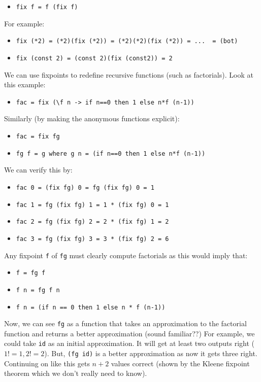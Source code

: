 \documentclass[11pt,a4paper,titlepage,dvipsnames,cmyk]{scrartcl}
\begin{document}
\begin{itemize}
    \item \lstinline|fix f = f (fix f)| 
\end{itemize}

For example:
\begin{itemize}
    \item \lstinline|fix (*2) = (*2)(fix (*2)) = (*2)(*2)(fix (*2)) = ...  = (bot)|
    \item \lstinline|fix (const 2) = (const 2)(fix (const2)) = 2| 
\end{itemize}

We can use fixpoints to redefine recursive functions (such as factorials).
Look at this example:
\begin{itemize}
    \item \lstinline|fac = fix (\f n -> if n==0 then 1 else n*f (n-1))| 
\end{itemize}

Similarly (by making the anonymous functions explicit):
\begin{itemize}
    \item \lstinline|fac = fix fg| 
    \item \lstinline|fg f = g where g n = (if n==0 then 1 else n*f (n-1))| 
\end{itemize}

We can verify this by:
\begin{itemize}
    \item \lstinline|fac 0 = (fix fg) 0 = fg (fix fg) 0 = 1| 
    \item \lstinline|fac 1 = fg (fix fg) 1 = 1 * (fix fg) 0 = 1| 
    \item \lstinline|fac 2 = fg (fix fg) 2 = 2 * (fix fg) 1 = 2| 
    \item \lstinline|fac 3 = fg (fix fg) 3 = 3 * (fix fg) 2 = 6| 
\end{itemize}

Any fixpoint \lstinline|f| of \lstinline|fg| must clearly compute
factorials as this would imply that:
\begin{itemize}
    \item \lstinline|f = fg f|
    \item \lstinline|f n = fg f n| 
    \item \lstinline|f n = (if n == 0 then 1 else n * f (n-1))|
\end{itemize}

Now, we can see \lstinline|fg| as a function that takes an approximation
to the factorial function and returns a better approximation (sound
familiar??) For example, we could take \lstinline|id| as an initial
approximation. It will get at least two outputs right ($1! = 1, 2! = 2$).
But, \lstinline|(fg id)|  is a better approximation as now it gets three
right. Continuing on like this gets $n+2$ values correct (shown by the
Kleene fixpoint theorem which we don't really need to know).
\end{document}
